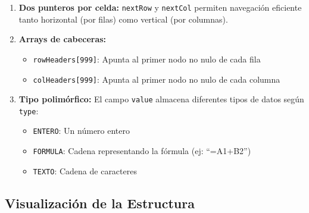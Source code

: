 \documentclass[12pt]{article}
\newcommand{\codigo}[1]{\texttt{\small #1}}
\begin{document}
\begin{enumerate}
    \item \textbf{Dos punteros por celda:} \codigo{nextRow} y \codigo{nextCol} permiten navegación eficiente tanto horizontal (por filas) como vertical (por columnas).
    
    \item \textbf{Arrays de cabeceras:} 
    \begin{itemize}
        \item \codigo{rowHeaders[999]}: Apunta al primer nodo no nulo de cada fila
        \item \codigo{colHeaders[999]}: Apunta al primer nodo no nulo de cada columna
    \end{itemize}
    
    \item \textbf{Tipo polimórfico:} El campo \codigo{value} almacena diferentes tipos de datos según \codigo{type}:
    \begin{itemize}
        \item \codigo{ENTERO}: Un número entero
        \item \codigo{FORMULA}: Cadena representando la fórmula (ej: ``=A1+B2'')
        \item \codigo{TEXTO}: Cadena de caracteres
    \end{itemize}
\end{enumerate}
 
\subsection*{Visualización de la Estructura}
 
\begin{center}
\end{center}
 
\end{document}
